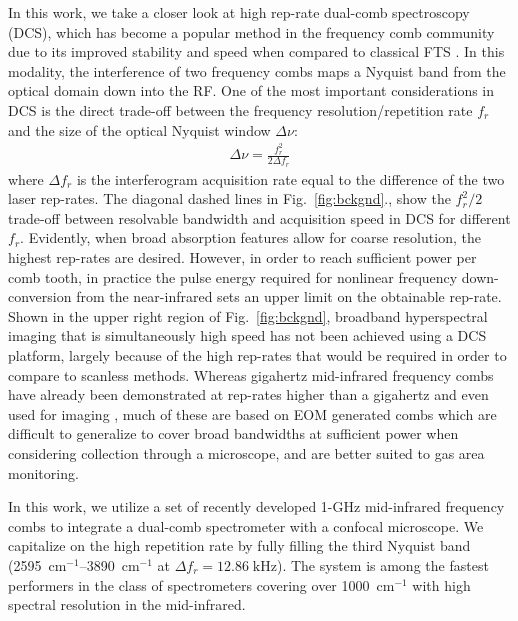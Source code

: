 \documentclass{optica-article}
\begin{document}
In this work, we take a closer look at high rep-rate dual-comb spectroscopy (DCS), which has become a popular method in the frequency comb community due to its improved stability and speed when compared to classical FTS \cite{coddingtonDualcombSpectroscopy2016}. In this modality, the interference of two frequency combs maps a Nyquist band from the optical domain down into the RF. One of the most important considerations in DCS is the direct trade-off between the frequency resolution/repetition rate $f_r$ and the size of the optical Nyquist window $\Delta \nu$:
% 
\begin{align}
    \Delta \nu = \frac{f_r^2}{2 \Delta f_r}
\end{align}
% 
where $\Delta f_r$ is the interferogram acquisition rate equal to the difference of the two laser rep-rates. The diagonal dashed lines in \mbox{Fig. \ref{fig:bckgnd}}., show the $f_r^2/2$ trade-off between resolvable bandwidth and acquisition speed in DCS for different $f_r$. Evidently, when broad absorption features allow for coarse resolution, the highest rep-rates are desired. However, in order to reach sufficient power per comb tooth, in practice the pulse energy required for nonlinear frequency down-conversion from the near-infrared sets an upper limit on the obtainable rep-rate. Shown in the upper right region of \mbox{Fig. \ref{fig:bckgnd}}, broadband hyperspectral imaging that is simultaneously high speed has not been achieved using a DCS platform, largely because of the high rep-rates that would be required in order to compare to scanless methods. Whereas gigahertz mid-infrared frequency combs have already been demonstrated at rep-rates higher than a gigahertz \cite{kowligyMidinfraredFrequencyCombs2020} and even used for imaging \cite{ullahkhanDirectHyperspectralDualcomb2020,khanSubGHzOpticalResolution2023}, much of these are based on EOM generated combs which are difficult to generalize to cover broad bandwidths at sufficient power when considering collection through a microscope, and are better suited to gas area monitoring. 

In this work, we utilize a set of recently developed 1-GHz mid-infrared frequency combs \cite{hoghooghiBroadband1GHzMidinfrared2022} to integrate a dual-comb spectrometer with a confocal microscope. We capitalize on the high repetition rate by fully filling the third Nyquist band (\mbox{2595 $\mathrm{cm^{-1}}$}--\mbox{3890 $\mathrm{cm^{-1}}$} at \mbox{$\Delta f_r=12.86 \; \text{kHz}$}). The system is among the fastest performers in the class of spectrometers covering over \mbox{1000 $\mathrm{cm^{-1}}$} with high spectral resolution in the mid-infrared.
\end{document}
